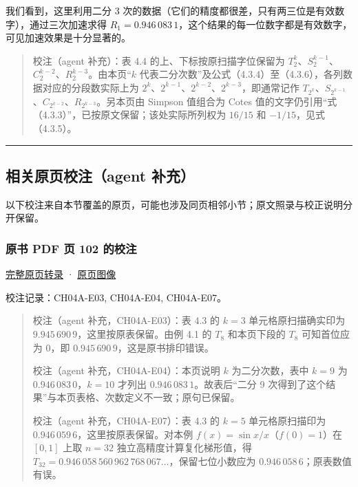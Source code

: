 \documentclass[
  10pt,
  fontset=fandol]{ctexart}
\begin{document}
我们看到，这里利用二分 3 次的数据（它们的精度都很差，只有两三位是有效数字），通过三次加速求得 \(R_1=0.946\,083\,1\)，这个结果的每一位数字都是有效数字，可见加速效果是十分显著的。

\begin{quote}
校注（agent 补充）：表 4.4 的上、下标按原扫描字位保留为 \(T_2^k\)、\(S_2^{k-1}\)、\(C_2^{k-2}\)、\(R_2^{k-3}\)。由本页``\(k\) 代表二分次数''及公式（4.3.4）至（4.3.6），各列数据对应的分段数实际上为 \(2^k\)、\(2^{k-1}\)、\(2^{k-2}\)、\(2^{k-3}\)，即通常记作 \(T_{2^k}\)、\(S_{2^{k-1}}\)、\(C_{2^{k-2}}\)、\(R_{2^{k-3}}\)。另本页由 Simpson 值组合为 Cotes 值的文字仍引用``式（4.3.3）''，已按原文保留；该处实际所列权为 \(16/15\) 和 \(-1/15\)，见式（4.3.5）。
\end{quote}

\begin{center}\rule{0.5\linewidth}{0.5pt}\end{center}

\subsection{相关原页校注（agent 补充）}\label{ux76f8ux5173ux539fux9875ux6821ux6ce8agent-ux8865ux5145}

以下校注来自本节覆盖的原页，可能也涉及同页相邻小节；原文照录与校正说明分开保留。

\subsubsection{原书 PDF 页 102 的校注}\label{ux539fux4e66-pdf-ux9875-102-ux7684ux6821ux6ce8}

\href{../pages/pdf-102.md}{完整原页转录} · \href{../../source-images/pdf-102.jpeg}{原页图像}

校注记录：CH04A-E03, CH04A-E04, CH04A-E07。

\begin{quote}
校注（agent 补充，CH04A-E03）：表 4.3 的 \(k=3\) 单元格原扫描确实印为 \(9.945\,690\,9\)，这里按原表保留。由例 4.1 的 \(T_8\) 和本页下段的 \(T_8\) 可知首位应为 \(0\)，即 \(0.945\,690\,9\)，这是原书排印错误。

校注（agent 补充，CH04A-E04）：本页说明 \(k\) 为二分次数，表中 \(k=9\) 为 \(0.946\,083\,0\)，\(k=10\) 才列出 \(0.946\,083\,1\)。故表后``二分 9 次得到了这个结果''与本页表格、次数定义不一致；原句已保留。

校注（agent 补充，CH04A-E07）：表 4.3 的 \(k=5\) 单元格原扫描印为 \(0.946\,059\,6\)，这里按原表保留。对本例 \(f(x)=\sin x/x\)（\(f(0)=1\)）在 \([0,1]\) 上取 \(n=32\) 独立高精度计算复化梯形值，得 \(T_{32}=0.946\,058\,560\,962\,768\,067\ldots\)，保留七位小数应为 \(0.946\,058\,6\)；原表数值有误。
\end{quote}
\end{document}
